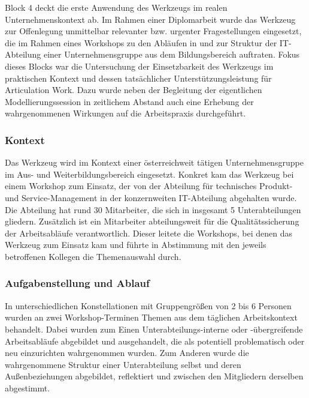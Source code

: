 Block 4 deckt die erste Anwendung des Werkzeugs im realen Unternehmenskontext ab. Im Rahmen einer Diplomarbeit \citep{Wahlmuller10} wurde das Werkzeug zur Offenlegung unmittelbar relevanter bzw. urgenter Fragestellungen eingesetzt, die im Rahmen eines Workshops zu den Abläufen in und zur Struktur der IT-Abteilung einer Unternehmensgruppe aus dem Bildungsbereich auftraten. Fokus dieses Blocks war die Untersuchung der Einsetzbarkeit des Werkzeugs im praktischen Kontext und dessen tatsächlicher Unterstützungsleistung für Articulation Work. Dazu wurde neben der Begleitung der eigentlichen Modellierungssession in zeitlichem Abstand auch eine Erhebung der wahrgenommenen Wirkungen auf die Arbeitspraxis durchgeführt.

\subsubsection{Kontext} %
\label{ssub:4_kontext}

Das Werkzeug wird im Kontext einer österreichweit tätigen Unternehmensgruppe im Aus- und Weiterbildungsbereich eingesetzt. Konkret kam das Werkzeug bei einem Workshop zum Einsatz, der von der Abteilung für technisches Produkt- und Service-Management in der konzernweiten IT-Abteilung abgehalten wurde. Die Abteilung hat rund 30 Mitarbeiter, die sich in insgesamt 5 Unterabteilungen gliedern. Zusätzlich ist ein Mitarbeiter abteilungsweit für die Qualitätssicherung der Arbeitsabläufe verantwortlich. Dieser leitete die Workshops, bei denen das Werkzeug zum Einsatz kam und führte in Abstimmung mit den jeweils betroffenen Kollegen die Themenauswahl durch.


\subsubsection{Aufgabenstellung und Ablauf} %
\label{ssub:4_aufgabenstellung}

In unterschiedlichen Konstellationen mit Gruppengrößen von 2 bis 6 Personen wurden an zwei Workshop-Terminen Themen aus dem täglichen Arbeitskontext behandelt. Dabei wurden zum Einen Unterabteilungs-interne oder -übergreifende Arbeitsabläufe abgebildet und ausgehandelt, die als potentiell problematisch oder neu einzurichten wahrgenommen wurden. Zum Anderen wurde die wahrgenommene Struktur einer Unterabteilung selbst und deren Außenbeziehungen abgebildet, reflektiert und zwischen den Mitgliedern derselben abgestimmt.

